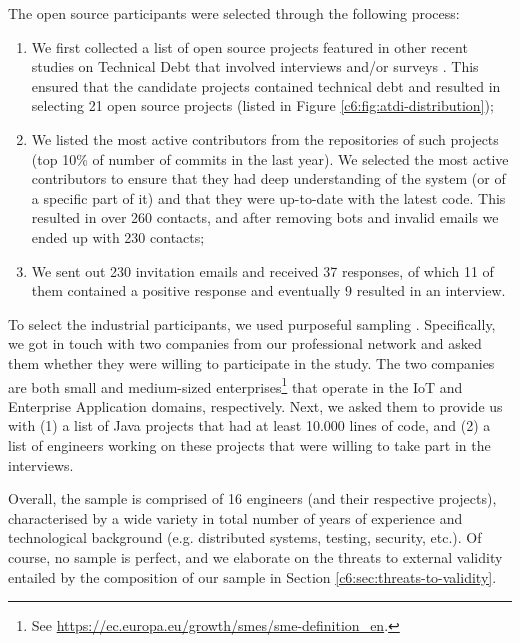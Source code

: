 The open source participants were selected through the following process:
\begin{enumerate}
    \item We first collected a list of open source projects featured in other recent studies on Technical Debt that involved interviews and/or surveys \cite{Tan2021,Maldonado2017,Zampetti2021}. This ensured that the candidate projects contained technical debt and resulted in selecting 21 open source projects (listed in Figure \ref{c6:fig:atdi-distribution});
    \item We listed the most active contributors from the repositories of such projects (top 10\% of number of commits in the last year). We selected the most active contributors to ensure that they had deep understanding of the system (or of a specific part of it) and that they were up-to-date with the latest code. 
    This resulted in over 260 contacts, and after removing bots and invalid emails we ended up with 230 contacts;
    \item We sent out 230 invitation emails and received 37 responses, of which 11 of them contained a positive response and eventually 9 resulted in an interview.
\end{enumerate}

To select the industrial participants, we used purposeful sampling \cite{Palinkas2015}. Specifically, we got in touch with two companies from our professional network and asked them whether they were willing to participate in the study. 
The two companies are both small and medium-sized enterprises\footnote{See \url{https://ec.europa.eu/growth/smes/sme-definition_en}.} that operate in the IoT and Enterprise Application domains, respectively.
Next, we asked them to provide us with (1) a list of Java projects that had at least 10.000 lines of code, and (2) a list of engineers working on these projects that were willing to take part in the interviews.

Overall, the sample is comprised of 16 engineers (and their respective projects), characterised by a wide variety in total number of years of experience and technological background (e.g. distributed systems, testing, security, etc.).
Of course, no sample is perfect, and we elaborate on the threats to external validity entailed by the composition of our sample in Section \ref{c6:sec:threats-to-validity}.

